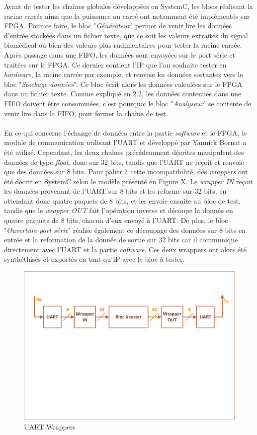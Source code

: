 \documentclass[a4paper,12pt]{article}
\begin{document}
	Avant de tester les chaînes globales développées en SystemC, les blocs réalisant la racine carrée ainsi que la puissance au carré ont notamment été implémentés sur FPGA. Pour ce faire, le bloc "\textit{Générateur}" permet de venir lire les données d'entrée stockées dans un fichier texte, que ce soit les valeurs extraites du signal biomédical ou bien des valeurs plus rudimentaires pour tester la racine carrée. Après passage dans une FIFO, les données sont envoyées sur le port série et traitées sur le FPGA. Ce dernier contient l'IP que l'on souhaite tester en \textit{hardware}, la racine carrée par exemple, et renvoie les données sortantes vers le bloc "\textit{Stockage données}". Ce bloc écrit alors les données calculées sur le FPGA dans un fichier texte. Comme expliqué en 2.2, les données contenues dans une FIFO doivent être consommées, c'est pourquoi le bloc "\textit{Analyseur}" se contente de venir lire dans la FIFO, pour fermer la chaîne de test.  \\ \\
	\indent En ce qui concerne l'échange de données entre la partie \textit{software} et le FPGA, le module de communication utilisant l'UART et développé par Yannick Bornat a été utilisé. Cependant, les deux chaînes précédemment décrites manipulent des données de type \textit{float}, donc sur 32 bits, tandis que l'UART ne reçoit et renvoie que des données sur 8 bits. Pour palier à cette incompatibilité, des \textit{wrappers} ont été décrit en SystemC selon le modèle présenté en Figure X. Le \textit{wrapper IN} reçoit les données provenant de l'UART sur 8 bits et les reforme sur 32 bits, en attendant donc quatre paquets de 8 bits, et les envoie ensuite au bloc de test, tandis que le \textit{wrapper OUT} fait l'opération inverse et découpe la donnée en quatre paquets de 8 bits, chacun d'eux envoyé à l'UART. De plus, le bloc "\textit{Ouverture port série}" réalise également ce découpage des données sur 8 bits en entrée et la reformation de la donnée de sortie sur 32 bits car il communique directement avec l'UART et la partie \textit{software}. Ces deux wrappers ont alors été synthéthisés et exportés en tant qu'IP avec le bloc à tester.  
	\begin{figure}[H]
		\centering
		\includegraphics[width=\textwidth]{Dessin7.pdf}
		\caption{UART Wrappers}
	\end{figure}   
\end{document}
